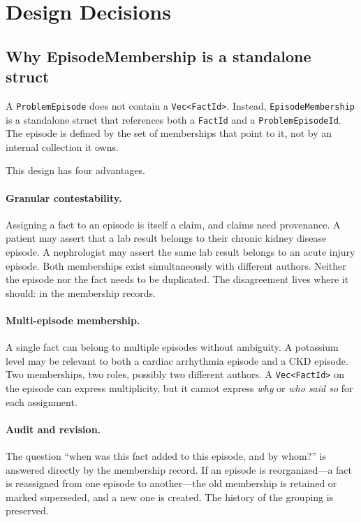 \documentclass[11pt]{article}
\begin{document}
\section{Design Decisions}
\label{sec:design-decisions}

\subsection{Why EpisodeMembership is a standalone struct}
\label{sec:membership-rationale}

A \texttt{ProblemEpisode} does not contain a \texttt{Vec<FactId>}. Instead,
\texttt{EpisodeMembership} is a standalone struct that references both a
\texttt{FactId} and a \texttt{ProblemEpisodeId}. The episode is defined by the
set of memberships that point to it, not by an internal collection it owns.

This design has four advantages.

\paragraph{Granular contestability.}
Assigning a fact to an episode is itself a claim, and claims need provenance.
A patient may assert that a lab result belongs to their chronic kidney disease
episode. A nephrologist may assert the same lab result belongs to an acute
injury episode. Both memberships exist simultaneously with different authors.
Neither the episode nor the fact needs to be duplicated. The disagreement
lives where it should: in the membership records.

\paragraph{Multi-episode membership.}
A single fact can belong to multiple episodes without ambiguity. A potassium
level may be relevant to both a cardiac arrhythmia episode and a CKD episode.
Two memberships, two roles, possibly two different authors. A
\texttt{Vec<FactId>} on the episode can express multiplicity, but it cannot
express \emph{why} or \emph{who said so} for each assignment.

\paragraph{Audit and revision.}
The question ``when was this fact added to this episode, and by whom?'' is
answered directly by the membership record. If an episode is reorganized---a
fact is reassigned from one episode to another---the old membership is
retained or marked superseded, and a new one is created. The history of the
grouping is preserved.
\end{document}
